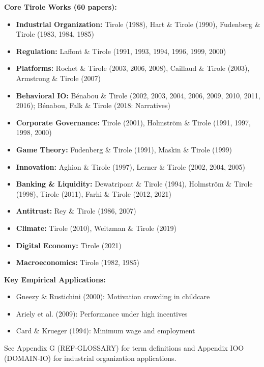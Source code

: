 \textbf{Core Tirole Works (60 papers):}
\begin{itemize}
    \item \textbf{Industrial Organization:} Tirole (1988), Hart \& Tirole (1990), Fudenberg \& Tirole (1983, 1984, 1985)
    \item \textbf{Regulation:} Laffont \& Tirole (1991, 1993, 1994, 1996, 1999, 2000)
    \item \textbf{Platforms:} Rochet \& Tirole (2003, 2006, 2008), Caillaud \& Tirole (2003), Armstrong \& Tirole (2007)
    \item \textbf{Behavioral IO:} Bénabou \& Tirole (2002, 2003, 2004, 2006, 2009, 2010, 2011, 2016); Bénabou, Falk \& Tirole (2018: Narratives)
    \item \textbf{Corporate Governance:} Tirole (2001), Holmström \& Tirole (1991, 1997, 1998, 2000)
    \item \textbf{Game Theory:} Fudenberg \& Tirole (1991), Maskin \& Tirole (1999)
    \item \textbf{Innovation:} Aghion \& Tirole (1997), Lerner \& Tirole (2002, 2004, 2005)
    \item \textbf{Banking \& Liquidity:} Dewatripont \& Tirole (1994), Holmström \& Tirole (1998), Tirole (2011), Farhi \& Tirole (2012, 2021)
    \item \textbf{Antitrust:} Rey \& Tirole (1986, 2007)
    \item \textbf{Climate:} Tirole (2010), Weitzman \& Tirole (2019)
    \item \textbf{Digital Economy:} Tirole (2021)
    \item \textbf{Macroeconomics:} Tirole (1982, 1985)
\end{itemize}

\textbf{Key Empirical Applications:}
\begin{itemize}
    \item Gneezy \& Rustichini (2000): Motivation crowding in childcare
    \item Ariely et al. (2009): Performance under high incentives
    \item Card \& Krueger (1994): Minimum wage and employment
\end{itemize}

See Appendix G (REF-GLOSSARY) for term definitions and Appendix IOO (DOMAIN-IO) for industrial organization applications.


